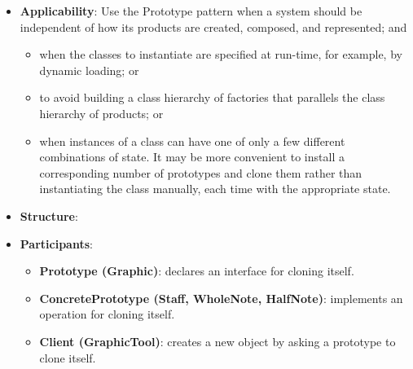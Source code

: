 \documentclass{report}
\begin{document}
\begin{itemize}
            \bigbreak \noindent 
            So in our music editor, each tool for creating a music object is an instance of GraphicTool that's initialized with a different prototype. Each GraphicTool instance will produce a music object by cloning its prototype and adding the clone to the score.
            \bigbreak \noindent 
            \bigbreak \noindent 
            We can use the Prototype pattern to reduce the number of classes even further. We have separate classes for whole notes and half notes, but that's probably unnecessary. Instead they could be instances of the same class initialized with different bitmaps and durations. A tool for creating whole notes becomes just a GraphicTool whose prototype is a MusicalNote initialized to be a whole note. This can reduce the number of classes in the system dramatically. It also makes it easier to add a new kind of note to the music editor.
        \item \textbf{Applicability}: Use the Prototype pattern when a system should be independent of how its products are created, composed, and represented; and
            \begin{itemize}
                \item when the classes to instantiate are specified at run-time, for example, by dynamic loading; or
                \item to avoid building a class hierarchy of factories that parallels the class hierarchy of products; or
                \item when instances of a class can have one of only a few different combinations of state. It may be more convenient to install a corresponding number of prototypes and clone them rather than instantiating the class manually, each time with the appropriate state.
            \end{itemize}
        \item \textbf{Structure}: 
            \bigbreak \noindent 
        \item \textbf{Participants}: 
            \begin{itemize}
                \item \textbf{Prototype (Graphic)}: declares an interface for cloning itself.
                \item \textbf{ConcretePrototype (Staff, WholeNote, HalfNote)}: implements an operation for cloning itself.
                \item \textbf{Client (GraphicTool)}: creates a new object by asking a prototype to clone itself.

\end{itemize}
\end{itemize}
\end{document}
